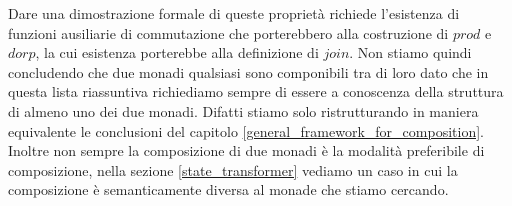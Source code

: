 Dare una dimostrazione formale di queste proprietà richiede l'esistenza di funzioni
ausiliarie di commutazione che porterebbero alla costruzione di $prod$ e $dorp$, la cui
esistenza porterebbe alla definizione di $join$.
Non stiamo quindi concludendo che due monadi qualsiasi sono componibili tra di loro
dato che in questa lista riassuntiva richiediamo sempre di essere a conoscenza della
struttura di almeno uno dei due monadi.
Difatti stiamo solo ristrutturando in maniera equivalente le conclusioni del capitolo
\ref{general_framework_for_composition}.\\
Inoltre non sempre la composizione di due monadi è la modalità preferibile di composizione,
nella sezione \ref{state_transformer} vediamo un caso in cui la composizione
è semanticamente diversa al monade che stiamo cercando.

\vfill